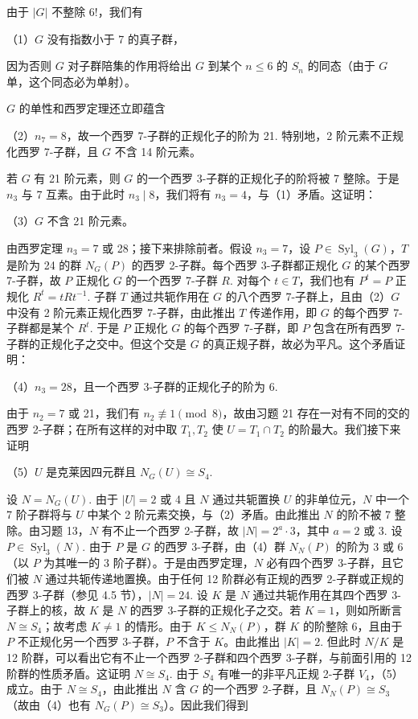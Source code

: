 由于 \(|G|\) 不整除 6!，我们有

\noindent（1）\(G\) 没有指数小于 7 的真子群，

因为否则 \(G\) 对子群陪集的作用将给出 \(G\) 到某个 \(n \leq 6\) 的 \(S_n\) 的同态（由于 \(G\) 单，这个同态必为单射）。

\(G\) 的单性和西罗定理还立即蕴含

\noindent（2）\(n_7 = 8\)，故一个西罗 7-子群的正规化子的阶为 21. 特别地，2 阶元素不正规化西罗 7-子群，且 \(G\) 不含 14 阶元素。

若 \(G\) 有 21 阶元素，则 \(G\) 的一个西罗 3-子群的正规化子的阶将被 7 整除。于是 \(n_3\) 与 7 互素。由于此时 \(n_3 \mid 8\)，我们将有 \(n_3 = 4\)，与（1）矛盾。这证明：

\noindent（3）\(G\) 不含 21 阶元素。

由西罗定理 \(n_3 = 7\) 或 28；接下来排除前者。假设 \(n_3 = 7\)，设 \(P \in \operatorname{Syl}_3(G)\)，\(T\) 是阶为 24 的群 \(N_G(P)\) 的西罗 2-子群。每个西罗 3-子群都正规化 \(G\) 的某个西罗 7-子群，故 \(P\) 正规化 \(G\) 的一个西罗 7-子群 \(R\). 对每个 \(t \in T\)，我们也有 \(P^t = P\) 正规化 \(R^t = tRt^{-1}\). 子群 \(T\) 通过共轭作用在 \(G\) 的八个西罗 7-子群上，且由（2）\(G\) 中没有 2 阶元素正规化西罗 7-子群，由此推出 \(T\) 传递作用，即 \(G\) 的每个西罗 7-子群都是某个 \(R^t\). 于是 \(P\) 正规化 \(G\) 的每个西罗 7-子群，即 \(P\) 包含在所有西罗 7-子群的正规化子之交中。但这个交是 \(G\) 的真正规子群，故必为平凡。这个矛盾证明：

\noindent（4）\(n_3 = 28\)，且一个西罗 3-子群的正规化子的阶为 6.

由于 \(n_2 = 7\) 或 21，我们有 \(n_2 \not\equiv 1 \pmod 8\)，故由习题 21 存在一对有不同的交的西罗 2-子群；在所有这样的对中取 \(T_1, T_2\) 使 \(U = T_1 \cap T_2\) 的阶最大。我们接下来证明

\noindent（5）\(U\) 是克莱因四元群且 \(N_G(U) \cong S_4\).

设 \(N = N_G(U)\). 由于 \(|U| = 2\) 或 4 且 \(N\) 通过共轭置换 \(U\) 的非单位元，\(N\) 中一个 7 阶子群将与 \(U\) 中某个 2 阶元素交换，与（2）矛盾。由此推出 \(N\) 的阶不被 7 整除。由习题 13，\(N\) 有不止一个西罗 2-子群，故 \(|N| = 2^a \cdot 3\)，其中 \(a = 2\) 或 3. 设 \(P \in \operatorname{Syl}_3(N)\). 由于 \(P\) 是 \(G\) 的西罗 3-子群，由（4）群 \(N_N(P)\) 的阶为 3 或 6（以 \(P\) 为其唯一的 3 阶子群）。于是由西罗定理，\(N\) 必有四个西罗 3-子群，且它们被 \(N\) 通过共轭传递地置换。由于任何 12 阶群必有正规的西罗 2-子群或正规的西罗 3-子群（参见 4.5 节），\(|N| = 24\). 设 \(K\) 是 \(N\) 通过共轭作用在其四个西罗 3-子群上的核，故 \(K\) 是 \(N\) 的西罗 3-子群的正规化子之交。若 \(K = 1\)，则如所断言 \(N \cong S_4\)；故考虑 \(K \neq 1\) 的情形。由于 \(K \leq N_N(P)\)，群 \(K\) 的阶整除 6，且由于 \(P\) 不正规化另一个西罗 3-子群，\(P\) 不含于 \(K\)。由此推出 \(|K| = 2\). 但此时 \(N/K\) 是 12 阶群，可以看出它有不止一个西罗 2-子群和四个西罗 3-子群，与前面引用的 12 阶群的性质矛盾。这证明 \(N \cong S_4\). 由于 \(S_4\) 有唯一的非平凡正规 2-子群 \(V_4\)，（5）成立。由于 \(N \cong S_4\)，由此推出 \(N\) 含 \(G\) 的一个西罗 2-子群，且 \(N_N(P) \cong S_3\)（故由（4）也有 \(N_G(P) \cong S_3\)）。因此我们得到

